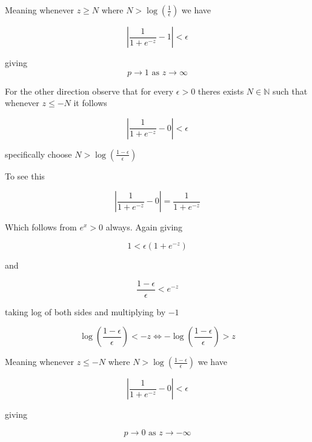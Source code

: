\documentclass{article}
\theoremstyle{remark}
\begin{document}
Meaning whenever $z \geq N$ where $N > \log\!\left(\frac{1}{\epsilon}\right)$ we have 

\begin{equation*}
\left|\frac{1}{1 + e^{-z}} - 1\right| < \epsilon 
\end{equation*}

giving 
\begin{equation*}
    p \to 1 \text{ as } z \to \infty
\end{equation*}

For the other direction observe that for every $\epsilon > 0$ 
theres exists $N \in \mathbb{N}$ such that whenever $z \leq -N$ it follows

\begin{equation*}
\left|\frac{1}{1 + e^{-z}} - 0\right| < \epsilon 
\end{equation*}

specifically choose $N > \log\!\left(\frac{1 - \epsilon}{\epsilon}\right)$

To see this

\begin{equation*}
\left|\frac{1}{1 + e^{-z}} - 0\right| = \frac{1}{1 + e^{-z}} 
\end{equation*}

Which follows from $e^{x} > 0$ always. Again giving

\begin{equation*}
    1 < \epsilon({1 + e^{-z}})
\end{equation*}

and 

\begin{equation*}
    \frac{1 - \epsilon}{\epsilon} < e^{-z}
\end{equation*}

taking log of both sides and multiplying by $-1$

\begin{equation*}
\log\!\left(\frac{1 - \epsilon}{\epsilon}\right) < -z \iff -\log\!\left(\frac{1 - \epsilon}{\epsilon}\right) > z
\end{equation*} 

Meaning whenever $z \leq -N$ where $N > \log\!\left(\frac{1 - \epsilon}{\epsilon}\right)$ we have 

\begin{equation*}
\left|\frac{1}{1 + e^{-z}} - 0\right| < \epsilon
\end{equation*}

giving

\begin{equation*}
p \to 0 \text{ as } z \to -\infty 
\end{equation*}
\end{document}
